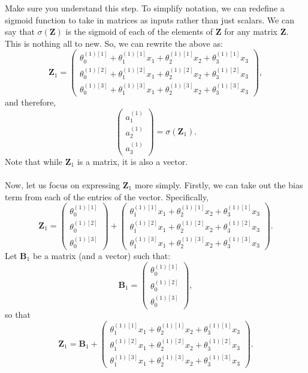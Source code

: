 \documentclass{article}
\begin{document}
Make sure you understand this step. To simplify notation, we can redefine a sigmoid function to take in matrices as inputs rather than just scalars. We can say that $\sigma(\textbf{Z})$ is the sigmoid of each of the elements of \textbf{Z} for any matrix \textbf{Z}. This is nothing all to new. So, we can rewrite the above as:
\[\textbf{Z}_1=\begin{pmatrix}
\theta_0^{(1)[1]}+\theta_1^{(1)[1]}x_1+\theta_2^{(1)[1]}x_2+\theta_3^{(1)[1]}x_3\\
\theta_0^{(1)[2]}+\theta_1^{(1)[2]}x_1+\theta_2^{(1)[2]}x_2+\theta_3^{(1)[2]}x_3\\
\theta_0^{(1)[3]}+\theta_1^{(1)[3]}x_1+\theta_2^{(1)[3]}x_2+\theta_3^{(1)[3]}x_3
\end{pmatrix},\]
and therefore, 
\[\begin{pmatrix}
a_1^{(1)}\\
a_2^{(1)}\\
a_3^{(1)}
\end{pmatrix}=\sigma(\textbf{Z}_1).\]
Note that while $\textbf{Z}_1$ is a matrix, it is also a vector. 
\\
\\
Now, let us focus on expressing $\textbf{Z}_1$ more simply. Firstly, we can take out the bias term from each of the entries of the vector. Specifically, 
\[\textbf{Z}_1=\begin{pmatrix}
\theta_0^{(1)[1]}\\
\theta_0^{(1)[2]}\\
\theta_0^{(1)[3]}
\end{pmatrix}+
\begin{pmatrix}
\theta_1^{(1)[1]}x_1+\theta_2^{(1)[1]}x_2+\theta_3^{(1)[1]}x_3\\
\theta_1^{(1)[2]}x_1+\theta_2^{(1)[2]}x_2+\theta_3^{(1)[2]}x_3\\
\theta_1^{(1)[3]}x_1+\theta_2^{(1)[3]}x_2+\theta_3^{(1)[3]}x_3
\end{pmatrix}.\]
Let $\textbf{B}_1$ be a matrix (and a vector) such that:
\[\textbf{B}_1=\begin{pmatrix}
\theta_0^{(1)[1]}\\
\theta_0^{(1)[2]}\\
\theta_0^{(1)[3]}
\end{pmatrix},\]
so that
\[\textbf{Z}_1=\textbf{B}_1+
\begin{pmatrix}
\theta_1^{(1)[1]}x_1+\theta_2^{(1)[1]}x_2+\theta_3^{(1)[1]}x_3\\
\theta_1^{(1)[2]}x_1+\theta_2^{(1)[2]}x_2+\theta_3^{(1)[2]}x_3\\
\theta_1^{(1)[3]}x_1+\theta_2^{(1)[3]}x_2+\theta_3^{(1)[3]}x_3
\end{pmatrix}.\]
\end{document}
